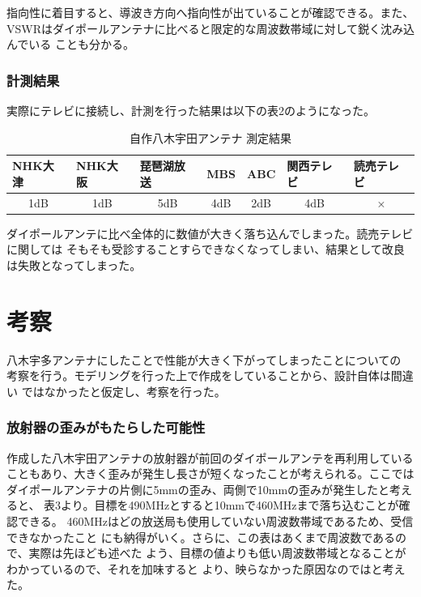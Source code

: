 \documentclass[dvipdfmx,autodetect-engine,titlepage]{jsarticle}
\begin{document}
指向性に着目すると、導波き方向へ指向性が出ていることが確認できる。また、
VSWRはダイポールアンテナに比べると限定的な周波数帯域に対して鋭く沈み込んでいる
ことも分かる。

\subsubsection*{計測結果}
実際にテレビに接続し、計測を行った結果は以下の表2のようになった。

\begin{table}[h]
  \caption{自作八木宇田アンテナ 測定結果}
  \centering
  \begin{tabular}{|l|l|l|l|l|l|l|}
  \hline
  NHK大津                     & NHK大阪                    & 琵琶湖放送                    & MBS                      & ABC                      & 関西テレビ                    & 読売テレビ                  \\ \hline\hline
  \multicolumn{1}{|c|}{1dB} & \multicolumn{1}{c|}{1dB} & \multicolumn{1}{c|}{5dB} & \multicolumn{1}{c|}{4dB} & \multicolumn{1}{c|}{2dB} & \multicolumn{1}{c|}{4dB} & \multicolumn{1}{c|}{×} \\ \hline
  \end{tabular}
  \end{table}

  ダイポールアンテに比べ全体的に数値が大きく落ち込んでしまった。読売テレビに関しては
  そもそも受診することすらできなくなってしまい、結果として改良は失敗となってしまった。

\section{考察}
八木宇多アンテナにしたことで性能が大きく下がってしまったことについての
考察を行う。モデリングを行った上で作成をしていることから、設計自体は間違い
ではなかったと仮定し、考察を行った。

\subsubsection*{放射器の歪みがもたらした可能性}

作成した八木宇田アンテナの放射器が前回のダイポールアンテを再利用している
こともあり、大きく歪みが発生し長さが短くなったことが考えられる。ここでは
ダイポールアンテナの片側に5mmの歪み、両側で10mmの歪みが発生したと考えると、
表3より。目標を490MHzとすると10mmで460MHzまで落ち込むことが確認できる。
460MHzはどの放送局も使用していない周波数帯域であるため、受信できなかったこと
にも納得がいく。さらに、この表はあくまで周波数であるので、実際は先ほども述べた
よう、目標の値よりも低い周波数帯域となることがわかっているので、それを加味すると
より、映らなかった原因なのではと考えた。
\end{document}
